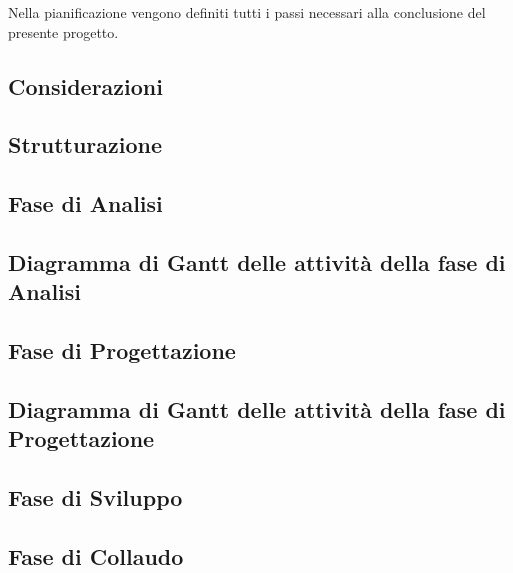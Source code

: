 Nella pianificazione vengono definiti tutti i passi necessari alla conclusione del presente progetto.

\subsection{Considerazioni}\label{sec:Considerazioni}


\subsection{Strutturazione}\label{sec:Strutturazione}

\newpage
\subsection{Fase di Analisi}\label{sec:Periodo 1 Analisi}

\subsection{Diagramma di Gantt delle attività della fase di Analisi}\label{sec:Gant Analisi}


\subsection{Fase di Progettazione}\label{Progettazione}

\newpage
\subsection{Diagramma di Gantt delle attività della fase di Progettazione}
\label{sec:Gant Progettazione}
%
    
\subsection{Fase di Sviluppo}\label{sec:Sviluppo}

    
\subsection{Fase di Collaudo}\label{sec:Collaudo}
